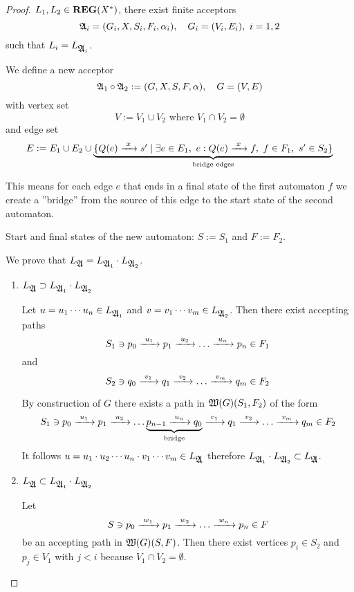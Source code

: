 \begin{proof}
$L_1, L_2 \in \mbox{{\bf REG}}(X^*)$, there exist finite acceptors
\[ \mbox{$\mathfrak{A}$}_i = (G_i, X, S_i, F_i, \alpha_i),\quad G_i = (V_i, E_i),\ i=1,2 \]
such that $L_i = L_{\mbox{$\mathfrak{A}$}_i}$.

We define a new acceptor
\[ \mbox{$\mathfrak{A}$}_1 \circ \mbox{$\mathfrak{A}$}_2 := (G, X, S, F, \alpha),\quad G = (V, E) \]
with vertex set
\[ V := V_1 \cup V_2\text{ where }V_1 \cap V_2 = \emptyset \]
and edge set
\[ E := E_1 \cup E_2 \cup \underbrace{\mbox{$\{Q(e) \xrightarrow{\ {x}\ } s' \mid \exists
e \in E_1,\ e: Q(e) \xrightarrow{\ {x}\ } f,\ f \in F_1,\ s' \in S_2\}$}}_{\text{bridge edges}}
\]

This means for each edge $e$ that ends in a final state of the first automaton 
$f$ we create a ''bridge'' from the source of this edge to the start state of
the second automaton.

Start and final states of the new automaton: $S := S_1$ and $F := F_2$.

\begin{center}

\end{center}

We prove that $L_{\mbox{$\mathfrak{A}$}} = L_{\mbox{$\mathfrak{A}$}_1} \cdot L_{\mbox{$\mathfrak{A}$}_2}$.

\begin{enumerate}
  \item $L_{\mbox{$\mathfrak{A}$}} \supset L_{\mbox{$\mathfrak{A}$}_1} \cdot L_{\mbox{$\mathfrak{A}$}_2}$
  
  Let $u = u_1 \cdots u_n \in L_{\mbox{$\mathfrak{A}$}_1}$ and $v = v_1 \cdots v_m \in
  L_{\mbox{$\mathfrak{A}$}_2}$. Then there exist accepting paths
  \[ S_1 \ni p_0 \xrightarrow{\ {u_1}\ } p_1 \xrightarrow{\ {u_2}\ } \ldots \xrightarrow{\ {u_n}\ } p_n \in F_1 \]
  and 
  \[ S_2 \ni q_0 \xrightarrow{\ {v_1}\ } q_1 \xrightarrow{\ {v_2}\ } \ldots \xrightarrow{\ {v_m}\ } q_m \in F_2 \]
  
  By construction of $G$ there exists a path in $\mbox{$\mathfrak{W}({G})$}(S_1, F_2)$ of
  the form
  \[ S_1 \ni p_0 \xrightarrow{\ {u_1}\ } p_1 \xrightarrow{\ {u_2}\ } \ldots \underbrace{p_{n-1} \xrightarrow{\ {u_n}\ }
  q_0}_{\text{bridge}} \xrightarrow{\ {v_1}\ } q_1 \xrightarrow{\ {v_2}\ } \ldots \xrightarrow{\ {v_m}\ } q_m \in F_2
  \]
  It follows $u = u_1 \cdot u_2 \cdots u_n \cdot v_1 \cdots v_m \in L_{\mbox{$\mathfrak{A}$}}$
  therefore $L_{\mbox{$\mathfrak{A}$}_1} \cdot L_{\mbox{$\mathfrak{A}$}_2} \subset L_{\mbox{$\mathfrak{A}$}}$.
  \medskip
  
  \item $L_{\mbox{$\mathfrak{A}$}} \subset L_{\mbox{$\mathfrak{A}$}_1} \cdot L_{\mbox{$\mathfrak{A}$}_2}$
  
  Let \[ S \ni p_0 \xrightarrow{\ {w_1}\ } p_1 \xrightarrow{\ {w_2}\ } \ldots \xrightarrow{\ {w_n}\ } p_n \in F \]
  be an accepting path in $\mbox{$\mathfrak{W}({G})$}(S, F)$. Then there exist vertices $p_i
  \in S_2$ and $p_j \in V_1$ with $j < i$ because $V_1 \cap V_2 = \emptyset$.
  

\end{enumerate}
\end{proof}
